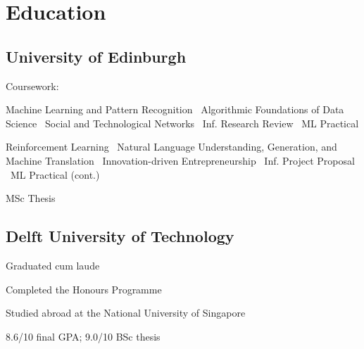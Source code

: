 \documentclass[]{deedy-resume-openfont}
\begin{document}

%
%

%
%
\begin{minipage}[t]{0.33\textwidth} 

\section{Education} 

\subsection{University of Edinburgh}

\vspace{0.2\topsep}
Coursework:
\begin{small}
\vspace{0.2\topsep}

Machine Learning and Pattern Recognition \textbullet \
Algorithmic Foundations of Data Science \textbullet \
Social and Technological Networks \textbullet \
Inf. Research Review \textbullet \
ML Practical
\vspace{0.3\topsep}

\custombold{Semester 2:}
Reinforcement Learning \textbullet \
Natural Language Understanding, Generation, and Machine Translation \textbullet \
Innovation-driven Entrepreneurship \textbullet \
Inf. Project Proposal \textbullet \
ML Practical (cont.)
\vspace{0.3\topsep}

\custombold{Summer:}
MSc Thesis

\end{small}
\vspace{\topsep}

\subsection{Delft University of \newline Technology}
\vspace{\topsep}
\begin{tightemize}
    \item Graduated cum laude
    \item Completed the Honours Programme
    \item Studied abroad at the National University of Singapore
    \item 8.6/10 final GPA; 9.0/10 BSc thesis
\end{tightemize}


\end{minipage}
\end{document}
